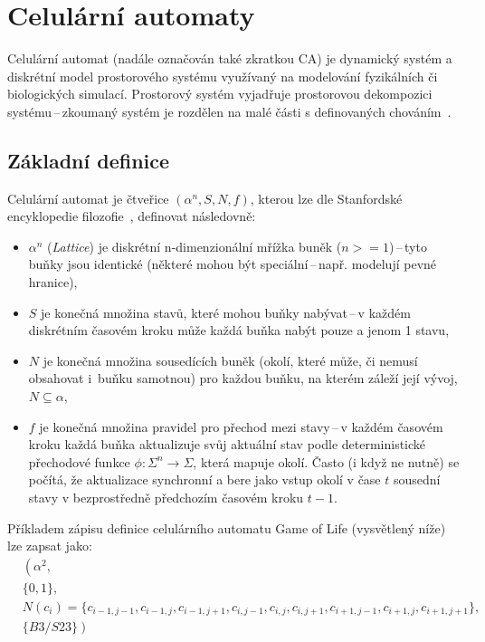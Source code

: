 \section{Celulární automaty}\label{chap:Celulární automaty}
Celulární automat (nadále označován také zkratkou CA) je dynamický systém a diskrétní model prostorového systému využívaný na modelování fyzikálních či biologických simulací. Prostorový systém vyjadřuje prostorovou dekompozici systému\,--\,zkoumaný systém je rozdělen na malé části s definovaných chováním~\cite{ims}.

\subsection*{Základní definice }
Celulární automat je čtveřice ${(\alpha^{n}, S, N, f)}$, kterou lze dle Stanfordské encyklopedie filozofie~\cite{sep-cellular-automata}, definovat následovně:
\begin{itemize}
    \item ${ \alpha^{n} }$ (\textit{Lattice}) je diskrétní n-dimenzionální mřížka buněk (${ n >= 1 }$)\,--\,tyto buňky jsou identické (některé mohou být speciální\,--\,např. modelují pevné hranice), 
    \item ${ S }$ je konečná množina stavů, které mohou buňky nabývat\,--\,v každém diskrétním časovém kroku může každá buňka nabýt pouze a jenom 1 stavu, 
    \item ${ N }$ je konečná množina sousedících buněk (okolí, které může, či nemusí obsahovat i~buňku samotnou) pro každou buňku, na kterém záleží její vývoj, ${ N \subseteq \alpha }$,
    \item ${ f }$ je konečná množina pravidel pro přechod mezi stavy\,--\,v každém časovém kroku každá buňka aktualizuje svůj aktuální stav podle deterministické přechodové funkce $\phi : \Sigma^n \rightarrow \Sigma$, která mapuje okolí. Často (i když ne nutně) se počítá, že aktualizace synchronní a bere jako vstup okolí v čase $t$ sousední stavy v bezprostředně předchozím časovém kroku $t-1$.
\end{itemize}
Příkladem zápisu definice celulárního automatu Game of Life (vysvětlený níže) lze zapsat jako:
\begin{equation*}
\begin{split}
    & \left( \alpha^{2}, \right. \\
    & \left. \{0, 1\}, \right. \\
    & \left. N(c_i) = \{ c_{i-1,j-1}, c_{i-1,j}, c_{i-1,j+1}, c_{i,j-1}, c_{i,j}, c_{i,j+1}, c_{i+1,j-1}, c_{i+1,j}, c_{i+1,j+1} \}, \right. \\
    & \left. \{B3/S23\} \right)
\end{split}
\end{equation*}

